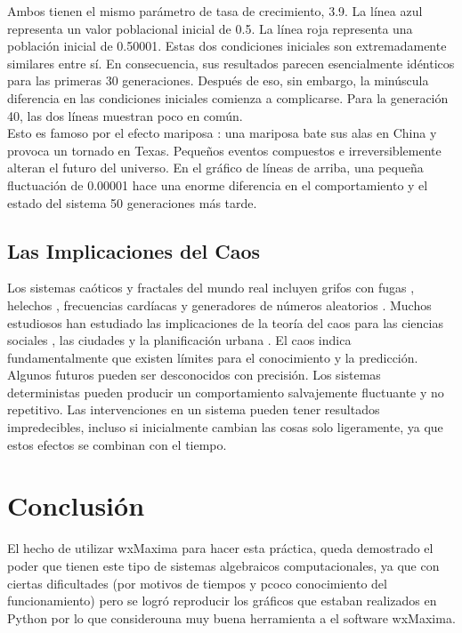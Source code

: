 \documentclass[12pt]{article}
\begin{document}
Ambos tienen el mismo parámetro de tasa de crecimiento, 3.9. La línea azul representa un valor poblacional inicial de 0.5. La línea roja representa una población inicial de 0.50001. Estas dos condiciones iniciales son extremadamente  similares entre sí. En consecuencia, sus resultados parecen esencialmente idénticos para las primeras 30 generaciones. Después de eso, sin embargo, la minúscula diferencia en las condiciones iniciales comienza a complicarse. Para la generación 40, las dos líneas muestran poco en común.\\

Esto es famoso por el efecto mariposa : una mariposa bate sus alas en China y provoca un tornado en Texas. Pequeños eventos compuestos e irreversiblemente alteran el futuro del universo. En el gráfico de líneas de arriba, una pequeña fluctuación de 0.00001 hace una enorme diferencia en el comportamiento y el estado del sistema 50 generaciones más tarde.

\subsection*{Las Implicaciones del Caos}
Los sistemas caóticos y fractales del mundo real incluyen grifos con fugas , helechos , frecuencias cardíacas y generadores de números aleatorios . Muchos estudiosos han estudiado las implicaciones de la teoría del caos para las ciencias sociales , las ciudades y la planificación urbana . El caos indica fundamentalmente que existen límites para el conocimiento y la predicción. Algunos futuros pueden ser desconocidos con precisión. Los sistemas deterministas pueden producir un comportamiento salvajemente fluctuante y no repetitivo. Las intervenciones en un sistema pueden tener resultados impredecibles, incluso si inicialmente cambian las cosas solo ligeramente, ya que estos efectos se combinan con el tiempo.

\section*{Conclusión}
El hecho de utilizar wxMaxima para hacer esta práctica, queda demostrado el poder que tienen este tipo de sistemas algebraicos computacionales, ya que con ciertas dificultades (por motivos de tiempos y pcoco conocimiento del funcionamiento) pero se logró reproducir los gráficos que estaban realizados en Python por lo que considerouna muy buena herramienta a el software wxMaxima.\\
\end{document}
